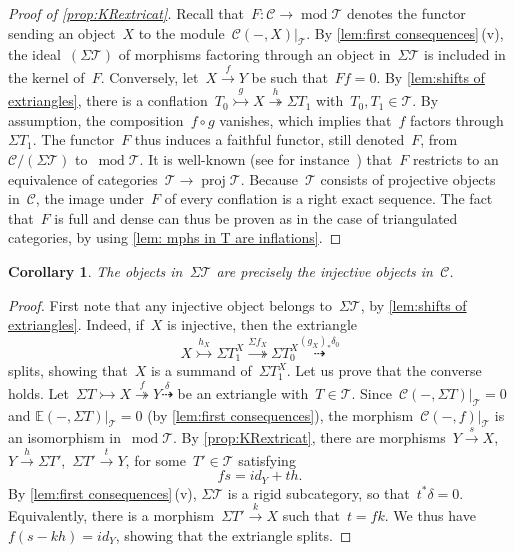 \documentclass{amsart}
\newtheorem{corollary}[theorem]{Corollary}
\theoremstyle{definition}
\newcommand{\cat}{\mathcal{C}}
\newcommand{\susp}{\Sigma}
\newcommand{\MOD}{\operatorname{mod}}
\newcommand{\proj}{\operatorname{proj}}
\newcommand{\tc}{\mathcal{T}}
\newcommand{\infl}{\rightarrowtail}
\newcommand{\defl}{\twoheadrightarrow}
\newcommand{\modt}{\MOD\tc}
\begin{document}
\begin{proof}[Proof of \cref{prop:KRextricat}]
Recall that~$F:\cat\to\modt$ denotes the functor sending an object~$X$ to the module~$\cat(-,X)|_\tc$.
By \cref{lem:first consequences}\,(v), the ideal~$(\susp\tc)$ of morphisms factoring through an object in~$\susp\tc$ is included in the kernel of~$F$.
Conversely, let~$X\xrightarrow{f}Y$ be such that~$Ff=0$.
By \cref{lem:shifts of extriangles}, there is a conflation~$T_0\overset{g}{\infl} X\overset{h}{\defl} \susp T_1$ with~$T_0,T_1\in\tc$.
By assumption, the composition~$f\circ g$ vanishes, which implies that~$f$ factors through~$\susp T_1$.
The functor~$F$ thus induces a faithful functor, still denoted~$F$, from~$\cat/(\susp\tc)$ to~$\modt$.
It is well-known (see for instance~\cite[Lem.~3.1]{AssemSimsonSkowronski}) that~$F$ restricts to an equivalence of categories~$\tc\to\proj\tc$.
Because~$\tc$ consists of projective objects in~$\cat$, the image under~$F$ of every conflation is a right exact sequence.
The fact that~$F$ is full and dense can thus be proven as in the case of triangulated categories, by using \cref{lem: mphs in T are inflations}.
\end{proof}

\begin{corollary}
\label{coro:Sigma T injectives}
The objects in~$\susp\tc$ are precisely the injective objects in~$\cat$.
\end{corollary}

\begin{proof}
First note that any injective object belongs to~$\susp \tc$, by \cref{lem:shifts of extriangles}.
Indeed, if~$X$ is injective, then the extriangle
\[
X \overset{h_X}{\infl} \susp T_1^X \overset{\susp f_X}{\defl} \susp T_0^X \overset{(g_X)_\ast\delta_0}{\dashrightarrow}
\]
splits, showing that~$X$ is a summand of~$\susp T_1^X$.
Let us prove that the converse holds.
Let~$\susp T \infl X \overset{f}{\defl} Y\overset{\delta}{\dashrightarrow}$ be an extriangle with~$T\in\tc$.
Since~$\cat(-,\susp T)|_\tc = 0$ and
$\mathbb{E}(-,\susp T)|_\tc =0$ (by \cref{lem:first consequences}),
the morphism~$\cat(-,f)|_\tc$ is an isomorphism in~$\modt$.
By \cref{prop:KRextricat}, there are morphisms~$Y\overset{s}{\to} X$,~$Y\xrightarrow{h}\susp T'$,~$\susp T'\xrightarrow{t} Y$, for some~$T'\in\tc$ satisfying
\[
fs = id_Y + th.
\]
By \cref{lem:first consequences}\,(v), $\susp\tc$ is a rigid subcategory, so that~$t^\ast\delta=0$.
Equivalently, there is a morphism~$\susp T'\xrightarrow{k} X$ such that~$t=fk$.
We thus have~$f(s-kh)=id_Y$, showing that the extriangle splits.
\end{proof}
\end{document}
